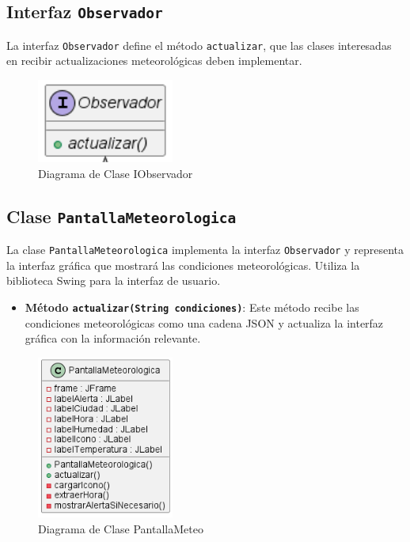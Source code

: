 \documentclass{article}
\begin{document}
\subsection{Interfaz \texttt{Observador}}
La interfaz \texttt{Observador} define el método \texttt{actualizar}, que las clases interesadas en recibir actualizaciones meteorológicas deben implementar.
\begin{figure}[H]
    \centering
    \includegraphics[width=0.4\textwidth]{IObservador.png}
    \caption{Diagrama de Clase IObservador}
    \label{figura:IObservador}
\end{figure}

\subsection{Clase \texttt{PantallaMeteorologica}}
La clase \texttt{PantallaMeteorologica} implementa la interfaz \texttt{Observador} y representa la interfaz gráfica que mostrará las condiciones meteorológicas. Utiliza la biblioteca Swing para la interfaz de usuario.

\begin{itemize}
    \item \textbf{Método \texttt{actualizar(String condiciones)}}: Este método recibe las condiciones meteorológicas como una cadena JSON y actualiza la interfaz gráfica con la información relevante.
\end{itemize}

\begin{figure}[H]
    \centering
    \includegraphics[width=0.4\textwidth]{PantallaMeteo.png}
    \caption{Diagrama de Clase PantallaMeteo}
    \label{figura:PantallaMeteo}
\end{figure}
\end{document}
